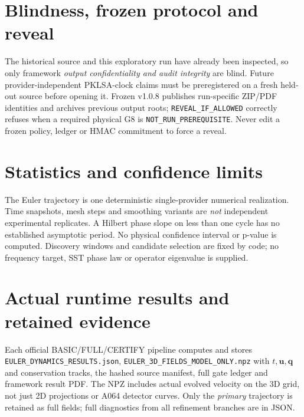 \documentclass[11pt,a4paper]{article}
\begin{document}
\section{Blindness, frozen protocol and reveal}
The historical source and this exploratory run have already been inspected, so only framework \emph{output confidentiality and audit integrity} are blind. Future provider-independent PKLSA-clock claims must be preregistered on a fresh held-out source before opening it. Frozen v1.0.8 publishes run-specific ZIP/PDF identities and archives previous output roots; \texttt{REVEAL\_IF\_ALLOWED} correctly refuses when a required physical G8 is \texttt{NOT\_RUN\_PREREQUISITE}. Never edit a frozen policy, ledger or HMAC commitment to force a reveal.

\section{Statistics and confidence limits}
The Euler trajectory is one deterministic single-provider numerical realization. Time snapshots, mesh steps and smoothing variants are \emph{not} independent experimental replicates. A Hilbert phase slope on less than one cycle has no established asymptotic period. No physical confidence interval or p-value is computed. Discovery windows and candidate selection are fixed by code; no frequency target, SST phase law or operator eigenvalue is supplied.

\section{Actual runtime results and retained evidence}
Each official BASIC/FULL/CERTIFY pipeline computes and stores \texttt{EULER\_DYNAMICS\_RESULTS.json}, \texttt{EULER\_3D\_FIELDS\_MODEL\_ONLY.npz} with $t,\mathbf u,\mathbf q$ and conservation tracks, the hashed source manifest, full gate ledger and framework result PDF. The NPZ includes actual evolved velocity on the 3D grid, not just 2D projections or A064 detector curves. Only the \emph{primary} trajectory is retained as full fields; full diagnostics from all refinement branches are in JSON.

\end{document}
